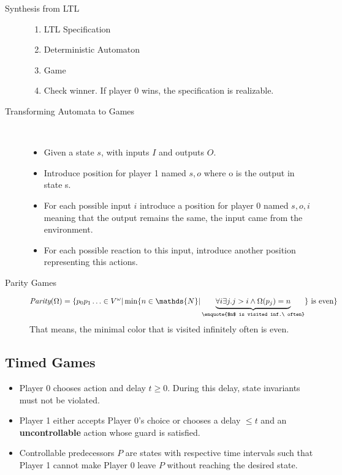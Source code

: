 \begin{description}
	\item[Synthesis from LTL] 
	\begin{enumerate}
		\item LTL Specification
		\item Deterministic Automaton
		\item Game
		\item Check winner. If player 0 wins, the specification is realizable.
	\end{enumerate}
	\item[Transforming Automata to Games] \ 
	\begin{itemize}
		\item Given a state $s$, with inputs $I$ and outputs $O$. 
		\item Introduce position for player 1 named $s, o$ where o is the output in state s. 
		\item For each possible input $i$ introduce a position for player 0 named $s, o, i$ meaning that the output remains the same, the input came from the environment. 
		\item For each possible reaction to this input, introduce another position representing this actions.
	\end{itemize}
	\item[Parity Games] 
	\[ \textit{Parity}(\Omega) = \{ p_0p_1\ldots \in V^\omega | \min\{ n \in \mathds{N} | \underbrace{\forall i \exists j. j>i \land \Omega(p_j) = n}_\text{\enquote{$n$ is visited inf.\ often}} \} \text{ is even} \} \] 
	That means, the minimal color that is visited infinitely often is even.
\end{description}

\subsection{Timed Games}

\begin{itemize}
	\item Player 0 chooses action and delay $t \geq 0$. During this delay, state invariants must not be violated.
	\item Player 1 either accepts Player 0's choice or chooses a delay $\leq t$ and an \textbf{uncontrollable} action whose guard is satisfied.
	\item Controllable predecessors $P$ are states with respective time intervals such that Player 1 cannot make Player 0 leave $P$ without reaching the desired state.
\end{itemize}

